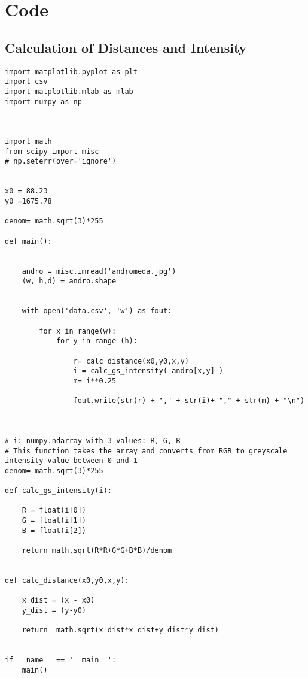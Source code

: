 \chapter{Code}
\section{Calculation of Distances and Intensity}

\begin{Verbatim}[fontsize=\small,baselinestretch=0.9]
import matplotlib.pyplot as plt
import csv
import matplotlib.mlab as mlab
import numpy as np



import math
from scipy import misc
# np.seterr(over='ignore')


x0 = 88.23
y0 =1675.78

denom= math.sqrt(3)*255

def main():


    andro = misc.imread('andromeda.jpg')
    (w, h,d) = andro.shape


    with open('data.csv', 'w') as fout:

        for x in range(w):
            for y in range (h):

                r= calc_distance(x0,y0,x,y)
                i = calc_gs_intensity( andro[x,y] )
                m= i**0.25

                fout.write(str(r) + "," + str(i)+ "," + str(m) + "\n")



# i: numpy.ndarray with 3 values: R, G, B
# This function takes the array and converts from RGB to greyscale intensity value between 0 and 1
denom= math.sqrt(3)*255

def calc_gs_intensity(i):

    R = float(i[0])
    G = float(i[1])
    B = float(i[2])

    return math.sqrt(R*R+G*G+B*B)/denom


def calc_distance(x0,y0,x,y):

    x_dist = (x - x0)
    y_dist = (y-y0)

    return  math.sqrt(x_dist*x_dist+y_dist*y_dist)


if __name__ == '__main__':
    main()
\end{Verbatim}

